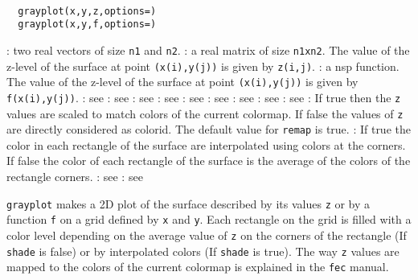 
\begin{mandesc}
  \\
\end{mandesc}
\begin{calling_sequence}
\begin{verbatim}
  grayplot(x,y,z,options=)
  grayplot(x,y,f,options=)
\end{verbatim}
\end{calling_sequence}

\begin{parameters}
  \begin{varlist}
    : two real vectors of size \verb!n1! and \verb!n2!.
    : a real matrix of size \verb!n1xn2!. The value of the z-level of the
    surface at point \verb!(x(i),y(j))! is given by \verb!z(i,j)!.
    : a nsp function. The value of the z-level of the
    surface at point \verb!(x(i),y(j))! is given by \verb!f(x(i),y(j))!.
    : see 
    : see 
    : see 
    : see 
    : see 
    : see 
    : see 
    : see 
    : see 
    : If true then the \verb!z! values are scaled to match colors
    of the current colormap.  If false the values of \verb!z! are directly
    considered as colorid. The default value for \verb!remap! is true.
    : If true the color in each rectangle of the surface are
    interpolated using colors at the corners. If false the color of each
    rectangle of the surface is the average of the colors of the rectangle
    corners.
    : see 
    : see 
    \end{varlist}
\end{parameters}
\begin{mandescription}
  \verb!grayplot! makes a 2D plot of the surface described by its values
  \verb!z! or by a function \verb!f!  on a grid defined by \verb!x! and
  \verb!y!.  Each rectangle on the grid is filled with a color level depending
  on the average value of \verb!z! on the corners of the rectangle (If
  \verb!shade! is false) or by interpolated colors (If \verb!shade! is
  true). The way \verb!z! values are mapped to the colors of the current
  colormap is explained in the \verb!fec! manual.
\end{mandescription}

